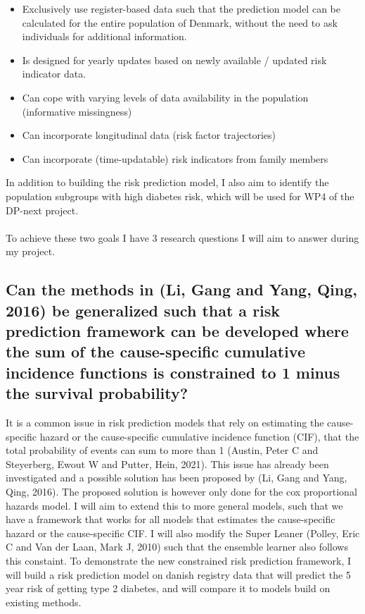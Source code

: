 \documentclass[11pt]{article}
\begin{document}
\begin{itemize}
\item Exclusively use register-based data such that the prediction model can be calculated for the entire population of Denmark, without the need to ask individuals for additional information.
\item Is designed for yearly updates based on newly available / updated risk indicator data.
\item Can cope with varying levels of data availability in the population (informative missingness)
\item Can incorporate longitudinal data (risk factor trajectories)
\item Can incorporate (time-updatable) risk indicators from family members
\end{itemize}

In addition to building the risk prediction model, I also aim to identify the population subgroups with
high diabetes risk, which will be used for WP4 of the DP-next project.\\[0pt]
\\[0pt]
To achieve these two goals I have 3 research questions I will aim to answer during my project.

\subsection{Can the methods in (Li, Gang and Yang, Qing, 2016) be generalized such that a risk prediction framework can be developed where the sum of the cause-specific cumulative incidence functions is constrained to 1 minus the survival probability?}
\label{sec:orgf824a6f}
It is a common issue in risk prediction models that rely on estimating the cause-specific hazard or
the cause-specific cumulative incidence function (CIF), that the total probability of events can sum
to more than 1 (Austin, Peter C and Steyerberg, Ewout W and Putter, Hein, 2021). This issue has already been investigated and a possible solution has been
proposed by (Li, Gang and Yang, Qing, 2016). The proposed solution is however only done for the cox proportional hazards
model. I will aim to extend this to more general models, such that we have a framework that works for all models that estimates the cause-specific hazard or the cause-specific CIF. I will also modify the Super Leaner (Polley, Eric C and Van der Laan, Mark J, 2010) such that the ensemble learner also follows this constaint.
To demonstrate the new constrained risk prediction framework, I will build a risk prediction model on danish registry data that will predict the 5 year risk of getting type 2 diabetes, and will compare it to models build on existing methods.
\end{document}
